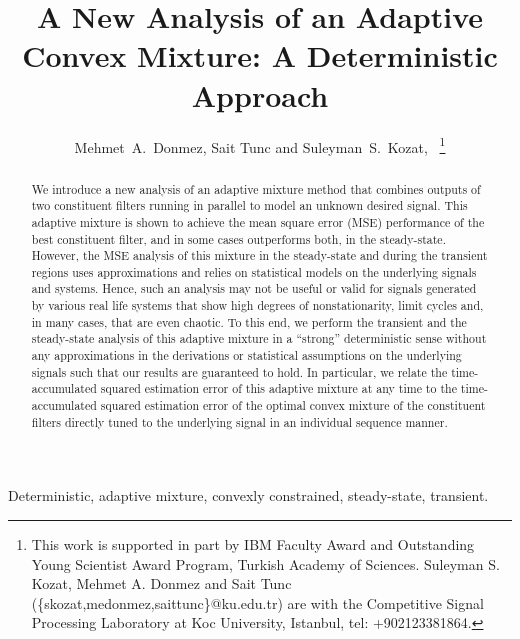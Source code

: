 \documentclass[journal]{IEEEtran}
\begin{document}
\title{A New Analysis of an Adaptive Convex Mixture: A Deterministic Approach}
\author{Mehmet~A.~Donmez, Sait Tunc and Suleyman~S.~Kozat,~
\thanks{ This work is supported in part by IBM Faculty Award and Outstanding Young Scientist Award Program, Turkish Academy of Sciences. Suleyman S. Kozat, Mehmet A. Donmez and Sait Tunc (\{skozat,medonmez,saittunc\}@ku.edu.tr) are with the Competitive Signal Processing Laboratory at Koc University, Istanbul, tel: +902123381864.}}

\maketitle

\begin{abstract}
We introduce a new analysis of an adaptive mixture method that
combines outputs of two constituent filters running in parallel to
model an unknown desired signal.  This adaptive mixture is shown to
achieve the mean square error (MSE) performance of the best
constituent filter, and in some cases outperforms both, in the
steady-state. However, the MSE analysis of this mixture in the
steady-state and during the transient regions uses approximations and
relies on statistical models on the underlying signals and
systems. Hence, such an analysis may not be useful or valid for
signals generated by various real life systems that show high degrees
of nonstationarity, limit cycles and, in many cases, that are even
chaotic. To this end, we perform the transient and the steady-state
analysis of this adaptive mixture in a ``strong'' deterministic sense
without any approximations in the derivations or statistical
assumptions on the underlying signals such that our results are
guaranteed to hold. In particular, we relate the time-accumulated
squared estimation error of this adaptive mixture at any time to the
time-accumulated squared estimation error of the optimal convex
mixture of the constituent filters directly tuned to the
underlying signal in an individual sequence manner.
\end{abstract}
\begin{IEEEkeywords}
Deterministic, adaptive mixture, convexly constrained, steady-state, transient.
\end{IEEEkeywords}

\IEEEpeerreviewmaketitle
\end{document}
